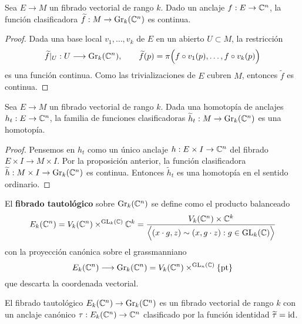 \begin{proposition}
Sea $E \to M$ un fibrado vectorial de rango $k$. Dado un anclaje $f : E \to \mathbb C^n$, la función clasificadora $\widetilde f : M \to \operatorname{Gr}_k(\mathbb C^n)$ es continua.
\end{proposition}

\begin{proof}
Dada una base local $v_1, \dots, v_k$ de $E$ en un abierto $U \subset M$, la restricción
$$\widetilde f \vert_U : U \longrightarrow \operatorname{Gr}_k(\mathbb C^n), \qquad \widetilde f(p) = \pi \Big( f \circ v_1(p), \dots, f \circ v_k(p) \Big)$$
es una función continua. Como las trivializaciones de $E$ cubren $M$, entonces $\widetilde f$ es continua.
\end{proof}

\begin{corollary}
Sea $E \to M$ un fibrado vectorial de rango $k$. Dada una homotopía de anclajes $h_t : E \to \mathbb C^n$, la familia de funciones clasificadoras $\widetilde h_t : M \to \operatorname{Gr}_k(\mathbb C^n)$ es una homotopía.
\end{corollary}

\begin{proof}
Pensemos en $h_t$ como un único anclaje $h : E \times I \to \mathbb C^n$ del fibrado $E \times I \to M \times I$. Por la proposición anterior, la función clasificadora $\widetilde h : M \times I \to \operatorname{Gr}_k(\mathbb C^n)$ es continua. Entonces $\widetilde h_t$ es una homotopía en el sentido ordinario.
\end{proof}

El \textbf{fibrado tautológico} sobre $\operatorname{Gr}_k(\mathbb C^n)$ se define como el producto balanceado
$$
E_k(\mathbb C^n)
    = V_k(\mathbb C^n) \times^{\operatorname{GL}_k(\mathbb C)} \mathbb C^k
    = \dfrac {V_k(\mathbb C^n) \times \mathbb C^k} {\Big \langle (x \cdot g, z) \sim (x, g \cdot z) : g \in \operatorname{GL}_k(\mathbb C) \Big \rangle}
$$
con la proyección canónica sobre el grassmanniano
$$E_k(\mathbb C^n) \longrightarrow \operatorname{Gr}_k(\mathbb C^n) = V_k(\mathbb C^n) \times^{\operatorname{GL}_n(\mathbb C)} \{ \operatorname{pt} \}$$
que descarta la coordenada vectorial.

\begin{theorem}
El fibrado tautológico $E_k(\mathbb C^n) \to \operatorname{Gr}_k(\mathbb C^n)$ es un fibrado vectorial de rango $k$ con un anclaje canónico $\tau : E_k(\mathbb C^n) \to \mathbb C^n$ clasificado por la función identidad $\widetilde \tau = \operatorname{id}$.
\end{theorem}

